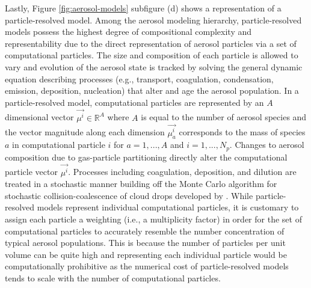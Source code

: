 Lastly, Figure \ref{fig:aerosol-models} subfigure (d) shows a representation of a particle-resolved model. Among the aerosol modeling hierarchy, particle-resolved models possess the highest degree of compositional complexity and representability due to the direct representation of aerosol particles via a set of computational particles. The size and composition of each particle is allowed to vary and evolution of the aerosol state is tracked by solving the general dynamic equation describing processes (e.g., transport, coagulation, condensation, emission, deposition, nucleation) that alter and age the aerosol population. In a particle-resolved model, computational particles are represented by an $A$ dimensional vector $\vec{\mu^i}\in \mathbb{R}^A$ where $A$ is equal to the number of aerosol species and the vector magnitude along each dimension $\vec{\mu_a^i}$ corresponds to the mass of species $a$ in computational particle $i$ for $a=1,...,A$ and $i=1,...,N_p$. Changes to aerosol composition due to gas-particle partitioning directly alter the computational particle vector $\vec{\mu^i}$. Processes including coagulation, deposition, and dilution are treated in a stochastic manner building off the Monte Carlo algorithm for stochastic collision-coalescence of cloud drops developed by \cite{gillespie_exact_1975}. While particle-resolved models represent individual computational particles, it is customary to assign each particle a weighting (i.e., a multiplicity factor) in order for the set of computational particles to accurately resemble the number concentration of typical aerosol populations. This is because the number of particles per unit volume can be quite high and representing each individual particle would be computationally prohibitive as the numerical cost of particle-resolved models tends to scale with the number of computational particles. 

